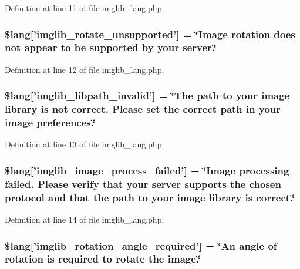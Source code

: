 Definition at line 11 of file imglib\-\_\-lang.\-php.

\hypertarget{imglib__lang_8php_ab1c77c6b58fc5bf8e979ab4237ec87e7}{
\subsubsection[{\$lang}]{\setlength{\rightskip}{0pt plus 5cm}\$lang\mbox{[}'imglib\-\_\-rotate\-\_\-unsupported'\mbox{]} = \char`\"{}Image rotation does {\bf not} appear {\bf to} be supported by your server.\char`\"{}}}\label{imglib__lang_8php_ab1c77c6b58fc5bf8e979ab4237ec87e7}


Definition at line 12 of file imglib\-\_\-lang.\-php.

\hypertarget{imglib__lang_8php_a8f190c17a02ca89334c8bf0a04333f65}{
\subsubsection[{\$lang}]{\setlength{\rightskip}{0pt plus 5cm}\$lang\mbox{[}'imglib\-\_\-libpath\-\_\-invalid'\mbox{]} = \char`\"{}The path {\bf to} your image library is {\bf not} correct. Please set the correct path in your image preferences.\char`\"{}}}\label{imglib__lang_8php_a8f190c17a02ca89334c8bf0a04333f65}


Definition at line 13 of file imglib\-\_\-lang.\-php.

\hypertarget{imglib__lang_8php_a9ac6659eb97dd12e5c714cc9635cf22e}{
\subsubsection[{\$lang}]{\setlength{\rightskip}{0pt plus 5cm}\$lang\mbox{[}'imglib\-\_\-image\-\_\-process\-\_\-failed'\mbox{]} = \char`\"{}Image processing failed. Please verify that your server supports the chosen protocol {\bf and} that the path {\bf to} your image library is correct.\char`\"{}}}\label{imglib__lang_8php_a9ac6659eb97dd12e5c714cc9635cf22e}


Definition at line 14 of file imglib\-\_\-lang.\-php.

\hypertarget{imglib__lang_8php_a1110d59ea8fd0564e78068dbda3438fb}{
\subsubsection[{\$lang}]{\setlength{\rightskip}{0pt plus 5cm}\$lang\mbox{[}'imglib\-\_\-rotation\-\_\-angle\-\_\-required'\mbox{]} = \char`\"{}An angle of rotation is required {\bf to} rotate the image.\char`\"{}}}\label{imglib__lang_8php_a1110d59ea8fd0564e78068dbda3438fb}


